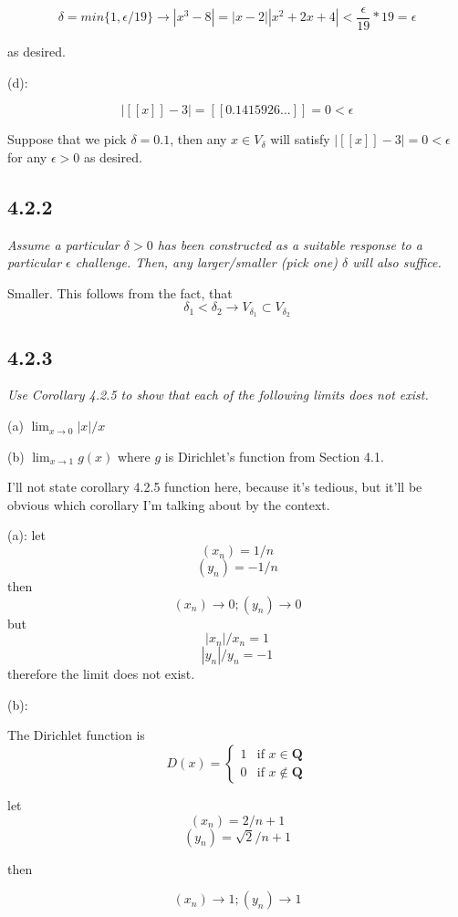 \documentclass[11pt,oneside,titlepage]{book}
\begin{document}
$$\delta = min\{1, \epsilon/19\} \to |x^3 - 8| = |x-2||x^2 + 2x + 4| < \frac{\epsilon}{19} * 19 = \epsilon $$

as desired.

(d):

$$ |[[x]] - 3| = [[0.1415926...]] = 0 < \epsilon $$

Suppose that we pick $\delta = 0.1$, then any $x \in V_{\delta}$ will satisfy $|[[x]] - 3| = 0 < \epsilon $
for any $\epsilon > 0$ as desired.

\subsection*{4.2.2}
\textit{Assume a particular $\delta > 0$ has been constructed as a suitable response
  to a particular $\epsilon$ challenge. Then, any larger/smaller (pick one) $\delta$ will also suffice.}

Smaller. This follows from the fact, that
$$\delta_1 < \delta_2 \to V_{\delta_1} \subset V_{\delta_2}$$

\subsection*{4.2.3}
\textit{Use Corollary 4.2.5 to show that each of the following limits does not exist.}

(a) $\lim_{x\to0} |x|/x$

(b) $\lim_{x\to 1} g(x)$ where $g$ is Dirichlet’s function from Section 4.1.

I'll not state corollary 4.2.5  function here, because it's tedious, but it'll be obvious which corollary I'm talking about by the context.


(a): let
$$(x_n) = 1/n$$
$$(y_n) = -1/n$$
then
$$(x_n) \to 0;(y_n) \to 0$$
but
$$|x_n| / x_n = 1$$
$$|y_n| / y_n = -1$$
therefore the limit does not exist.

(b):

The Dirichlet function is
\begin{equation}
D(x)=
    \begin{cases}
        1 & \text{if } x \in \textbf{Q}\\
        0 & \text{if } x \notin \textbf{Q}
    \end{cases}
\end{equation}

let
$$(x_n) = 2/n + 1$$
$$(y_n) = \sqrt{2}/n + 1$$

then

$$(x_n) \to 1;(y_n) \to 1$$
\end{document}
